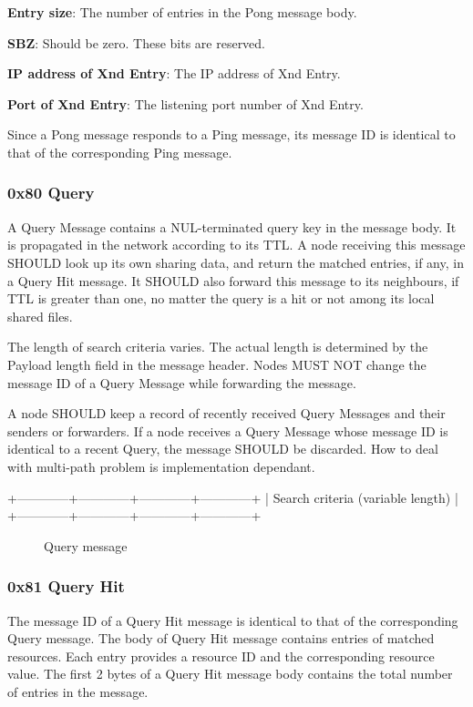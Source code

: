 \documentclass[12pt, a4paper]{article}
\begin{document}
\textbf{Entry size}: The number of entries in the Pong message body.

\textbf{SBZ}: Should be zero. These bits are reserved.

\textbf{IP address of Xnd Entry}: The IP address of Xnd Entry.

\textbf{Port of Xnd Entry}: The listening port number of Xnd Entry.

\vskip 12pt

Since a Pong message responds to a Ping message, its message ID is identical to that of the corresponding Ping message.


\subsubsection{0x80 Query}
A Query Message contains a NUL-terminated query key in the message body.
It is propagated in the network according to its TTL.
A node receiving this message SHOULD look up its own sharing data, and return the matched entries, if any, in a Query Hit message.
It SHOULD also forward this message to its neighbours, if TTL is greater than one, no matter the query is a hit or not among its local shared files.

The length of search criteria varies. The actual length is determined by the Payload length field in the message header.
Nodes MUST NOT change the message ID of a Query Message while forwarding the message.

A node SHOULD keep a record of recently received Query Messages and their senders or forwarders.
If a node receives a Query Message whose message ID is identical to a recent Query, the message SHOULD be discarded.
How to deal with multi-path problem is implementation dependant.

\begin{verbbox}
+------------+------------+------------+------------+
|     Search criteria (variable length)             |
+------------+------------+------------+------------+
\end{verbbox}

\begin{figure}[h!]
  \centering
  \theverbbox
  \label{query}
  \caption{Query message}
\end{figure}


\subsubsection{0x81 Query Hit}
The message ID of a Query Hit message is identical to that of the corresponding Query message.
The body of Query Hit message contains entries of matched resources.
Each entry provides a resource ID and the corresponding resource value.
The first 2 bytes of a Query Hit message body contains the total number of entries in the message.
\end{document}
